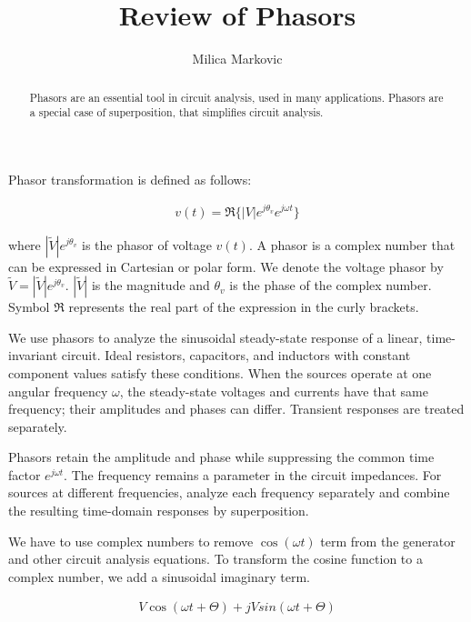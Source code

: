 \documentclass{ximera}
\title{Review of Phasors}
\author{Milica Markovic}
\begin{document}
  
\begin{abstract}  
Phasors are an essential tool in circuit analysis, used in many applications. Phasors are a special case of superposition, that simplifies circuit analysis.
\end{abstract}  
\maketitle    


\begin{definition}
Phasor transformation is defined as follows:

\begin{eqnarray}
v(t)=\Re\{|V|e^{j\theta_v} e^{j \omega t}\}
\end{eqnarray}

where $|\widetilde{V}|e^{j\theta_v}$ is the phasor of voltage $v(t)$. A phasor is a complex number that can be expressed in
Cartesian or polar form. We denote the voltage phasor by
$\widetilde{V}=|\widetilde{V}|e^{j\theta_v}$.
$ |\widetilde{V}|$ is the magnitude and $\theta_v$ is the phase of the complex number. Symbol $\Re$ represents the real part of the expression in the curly brackets.

\end{definition}



We use phasors to analyze the sinusoidal steady-state response
of a linear, time-invariant circuit. Ideal resistors, capacitors,
and inductors with constant component values satisfy these
conditions. When the sources operate at one angular frequency
$\omega$, the steady-state voltages and currents have that
same frequency; their amplitudes and phases can differ.
Transient responses are treated separately.

Phasors retain the amplitude and phase while suppressing the
common time factor $e^{j\omega t}$. The frequency remains
a parameter in the circuit impedances. For sources at different
frequencies, analyze each frequency separately and combine
the resulting time-domain responses by superposition.


 We have to use complex numbers to remove $ \cos (\omega t)$  term from the generator and other circuit analysis equations.  To transform the cosine function to a complex number, we add a sinusoidal imaginary term.

\begin{eqnarray}
 V \cos (\omega t + \Theta ) + j V sin (\omega t + \Theta) 
\end{eqnarray}
\end{document}
